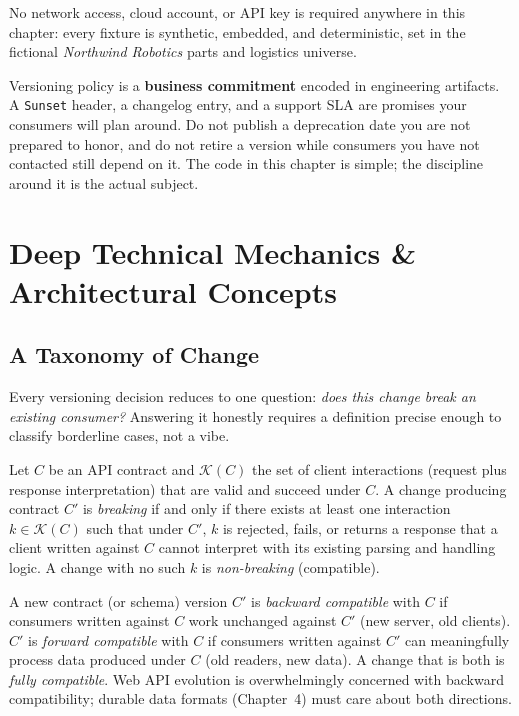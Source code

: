 No network access, cloud account, or API key is required anywhere in this
chapter: every fixture is synthetic, embedded, and deterministic, set in the
fictional \emph{Northwind Robotics} parts and logistics universe.

\begin{warningbox}
Versioning policy is a \textbf{business commitment} encoded in engineering
artifacts. A \texttt{Sunset} header, a changelog entry, and a support SLA are
promises your consumers will plan around. Do not publish a deprecation date
you are not prepared to honor, and do not retire a version while consumers
you have not contacted still depend on it. The code in this chapter is simple;
the discipline around it is the actual subject.
\end{warningbox}

\section{Deep Technical Mechanics \& Architectural Concepts}
\label{sec:ch9-mechanics}

\subsection{A Taxonomy of Change}
\label{subsec:ch9-taxonomy}

Every versioning decision reduces to one question: \emph{does this change
break an existing consumer?} Answering it honestly requires a definition
precise enough to classify borderline cases, not a vibe.

\begin{definition}
\label{def:breaking}
Let $C$ be an API contract and $\mathcal{K}(C)$ the set of client interactions
(request plus response interpretation) that are valid and succeed under $C$.
A change producing contract $C'$ is \emph{breaking} if and only if there
exists at least one interaction $k \in \mathcal{K}(C)$ such that under $C'$,
$k$ is rejected, fails, or returns a response that a client written against
$C$ cannot interpret with its existing parsing and handling logic. A change
with no such $k$ is \emph{non-breaking} (compatible).
\end{definition}

\begin{definition}
\label{def:compat}
A new contract (or schema) version $C'$ is \emph{backward compatible} with
$C$ if consumers written against $C$ work unchanged against $C'$ (new server,
old clients). $C'$ is \emph{forward compatible} with $C$ if consumers written
against $C'$ can meaningfully process data produced under $C$ (old readers,
new data). A change that is both is \emph{fully compatible}. Web API evolution
is overwhelmingly concerned with backward compatibility; durable data formats
(Chapter~4) must care about both directions.
\end{definition}

